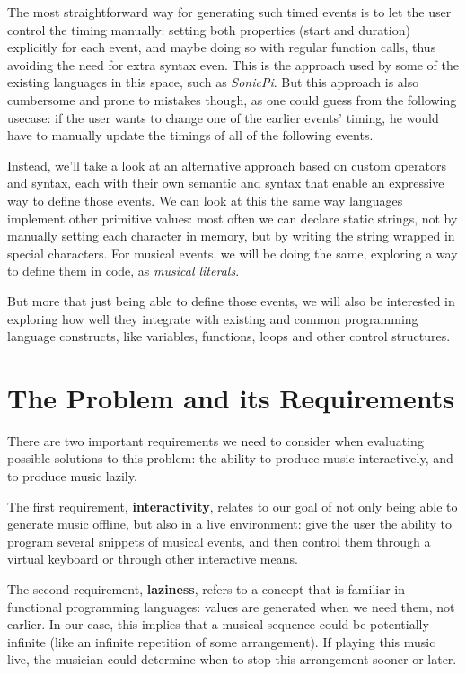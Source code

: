 \documentclass[a4paper,UKenglish,cleveref, autoref]{oasics-v2019}
\begin{document}
The most straightforward way for generating such timed events is to let the user control the timing manually: setting both properties (start and duration) explicitly for each event, and maybe doing so with regular function calls, thus avoiding the need for extra syntax even. This is the approach used by some of the existing languages in this space, such as \textit{SonicPi}. But this approach is also cumbersome and prone to mistakes though, as one could guess from the following usecase: if the user wants to change one of the earlier events' timing, he would have to manually update the timings of all of the following events.

Instead, we'll take a look at an alternative approach based on custom operators and syntax, each with their own semantic and syntax that enable an expressive way to define those events. We can look at this the same way languages implement other primitive values: most often we can declare static strings, not by manually setting each character in memory, but by writing the string wrapped in special characters. For musical events, we will be doing the same, exploring a way to define them in code, as \textit{musical literals}.

But more that just being able to define those events, we will also be interested in exploring how well they integrate with existing and common programming language constructs, like variables, functions, loops and other control structures.

\section{The Problem and its Requirements}
There are two important requirements we need to consider when evaluating possible solutions to this problem: the ability to produce music interactively, and to produce music lazily.

The first requirement, \textbf{interactivity}, relates to our goal of not only being able to generate music offline, but also in a live environment: give the user the ability to program several snippets of musical events, and then control them through a virtual keyboard or through other interactive means.

The second requirement, \textbf{laziness}, refers to a concept that is familiar in functional programming languages: values are generated when we need them, not earlier. In our case, this implies that a musical sequence could be potentially infinite (like an infinite repetition of some arrangement). If playing this music live, the musician could determine when to stop this arrangement sooner or later.
\end{document}
